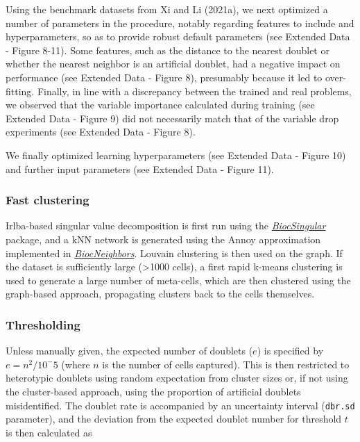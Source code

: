 \documentclass[10pt,a4paper,twocolumn]{article}
\begin{document}
Using the benchmark datasets from Xi and Li (2021a), we next optimized a number of parameters in the procedure, notably regarding features to include and hyperparameters, so as to provide robust default parameters (see Extended Data - Figure 8-11).
Some features, such as the distance to the nearest doublet or whether the nearest neighbor is an artificial doublet, had a negative impact on performance (see Extended Data - Figure 8), presumably because it led to over-fitting.
Finally, in line with a discrepancy between the trained and real problems, we observed that the variable importance calculated during training (see Extended Data - Figure 9) did not necessarily match that of the variable drop experiments (see Extended Data - Figure 8).

We finally optimized learning hyperparameters (see Extended Data - Figure 10) and further input parameters (see Extended Data - Figure 11).

\subsubsection{Fast clustering}

Irlba-based singular value decomposition is first run using the \emph{\href{https://bioconductor.org/packages/3.13/BiocSingular}{BiocSingular}} package, and a kNN network is generated using the Annoy approximation implemented in \emph{\href{https://bioconductor.org/packages/3.13/BiocNeighbors}{BiocNeighbors}}.
Louvain clustering is then used on the graph.
If the dataset is sufficiently large (\textgreater1000 cells), a first rapid k-means clustering is used to generate a large number of meta-cells, which are then clustered using the graph-based approach, propagating clusters back to the cells themselves.

\subsubsection{Thresholding}

Unless manually given, the expected number of doublets (\(e\)) is specified by \(e = n^2/10^-5\) (where \(n\) is the number of cells captured).
This is then restricted to heterotypic doublets using random expectation from cluster sizes or, if not using the cluster-based approach, using the proportion of artificial doublets misidentified.
The doublet rate is accompanied by an uncertainty interval (\texttt{dbr.sd} parameter), and the deviation from the expected doublet number for threshold \(t\) is then calculated as
\end{document}
